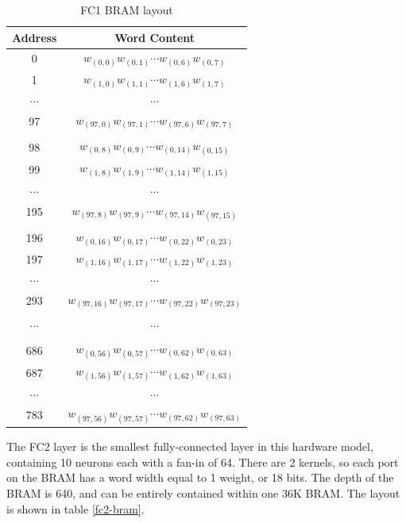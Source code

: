 \begin{table}
	\centering
	\begin{tabular}{|c|c|}
		\hline
		\textbf{Address} & \textbf{Word Content} \\\hline
		0 & $w_{(0, 0)}w_{(0, 1)}\cdots w_{(0, 6)}w_{(0, 7)}$\\
		1 & $w_{(1, 0)}w_{(1, 1)}\cdots w_{(1, 6)}w_{(1, 7)}$\\
		$\cdots$ & $\cdots$ \\
		97 & $w_{(97, 0)}w_{(97, 1)}\cdots w_{(97, 6)}w_{(97, 7)}$\\
		& \\
		98 & $w_{(0, 8)}w_{(0, 9)}\cdots w_{(0, 14)}w_{(0, 15)}$\\		
		99 & $w_{(1, 8)}w_{(1, 9)}\cdots w_{(1, 14)}w_{(1, 15)}$\\
		$\cdots$ & $\cdots$ \\
		195 & $w_{(97, 8)}w_{(97, 9)}\cdots w_{(97, 14)}w_{(97, 15)}$\\	
		& \\	
		196 & $w_{(0, 16)}w_{(0, 17)}\cdots w_{(0, 22)}w_{(0, 23)}$\\		
		197 & $w_{(1, 16)}w_{(1, 17)}\cdots w_{(1, 22)}w_{(1, 23)}$\\
		$\cdots$ & $\cdots$ \\
		293 & $w_{(97, 16)}w_{(97, 17)}\cdots w_{(97, 22)}w_{(97, 23)}$\\	
		& \\
		$\cdots$ & $\cdots$ \\	
		& \\
		686 & $w_{(0, 56)}w_{(0, 57)}\cdots w_{(0, 62)}w_{(0, 63)}$\\		
		687 & $w_{(1, 56)}w_{(1, 57)}\cdots w_{(1, 62)}w_{(1, 63)}$\\
		$\cdots$ & $\cdots$ \\	
		783 & $w_{(97, 56)}w_{(97, 57)}\cdots w_{(97, 62)}w_{(97, 63)}$\\
		\hline
	\end{tabular}	
	\caption{FC1 BRAM layout}	
	\label{fc1-bram}
\end{table}

The FC2 layer is the smallest fully-connected layer in this hardware model, containing 10 neurons each with a fan-in of 64. There are 2 kernels, so each port on the BRAM has a word width equal to 1 weight, or 18 bits. The depth of the BRAM is 640, and can be entirely contained within one 36K BRAM. The layout is shown in table \ref{fc2-bram}.

